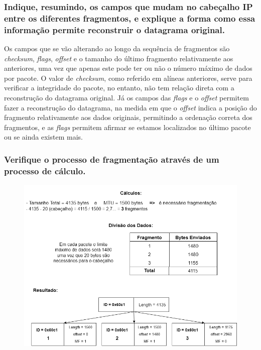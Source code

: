     
\subsubsection{Indique, resumindo, os campos que mudam no cabeçalho IP entre os diferentes fragmentos, e explique a forma como essa informação permite reconstruir o datagrama original.}

    \par Os campos que se vão alterando ao longo da sequência de fragmentos são \textit{checksum}, \textit{flags}, \textit{offset} e o tamanho do último fragmento relativamente aos anteriores, uma vez que apenas este pode ter ou não o número máximo de dados por pacote. O valor de \textit{checksum}, como referido em alíneas anteriores, serve para verificar a integridade do pacote, no entanto, não tem relação direta com a reconstrução do datagrama original. Já os campos das \textit{flags} e o \textit{offset} permitem fazer a reconstrução do datagrama, na medida em que o \textit{offset} indica a posição do fragmento relativamente aos dados originais, permitindo a ordenação correta dos fragmentos, e as \textit{flags} permitem afirmar se estamos localizados no último pacote ou se ainda existem mais.
    
    
\subsubsection{Verifique o processo de fragmentação através de um processo de cálculo.}

    \begin{figure}[H]
    \centering
    \includegraphics[width=490pt]{images/ParteI/Questao3/fragmentacao.png}
    \label{questao3-Calculo}
    \end{figure}
    
